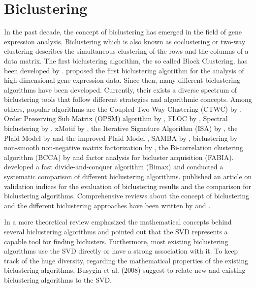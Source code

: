 \section{Biclustering} %
In the past decade, the concept of biclustering has emerged in the field of gene expression analysis. Biclustering which is also known as coclustering or two-way clustering describes the simultaneous clustering of the rows and the columns of a data matrix. 
The first biclustering algorithm, the so called Block Clustering, has been developed by \citet{Hartigan1972}. \citet{Cheng2000} proposed the first biclustering algorithm for the analysis of high dimensional gene expression data.
Since then, many different biclustering algorithms have been developed. 
Currently, their exists a diverse spectrum of biclustering tools that follow different strategies and algorithmic concepts.
Among others, popular algorithms are the Coupled Two-Way Clustering (CTWC) by \citet{Getz2000}, Order Preserving Sub Matrix (OPSM) algorithm by \citet{BenDor2003}, FLOC by \citet{Yang2003}, Spectral biclustering by \citet{Kluger2003}, xMotif by \citet{Kasif2003},
the Iterative Signature Algorithm (ISA) by \citet{Bergmann2003},
the Plaid Model by \citet{Lazzeroni2000} and the improved Plaid Model \cite{Turner2005}, SAMBA by \citet{Tanay2004}, biclustering by non-smooth non-negative matrix factorization by \citet{Carmona-Saez2006}, the Bi-correlation clustering algorithm (BCCA) by \citet{Bhattacharya2009} and factor analysis for bicluster acquisition (FABIA)\cite{Hochreiter2010}. \citet{Prelic2006} developed a fast divide-and-conquer algorithm (Bimax) and conducted a systematic comparison of different biclustering algorithms.
\citet{Santamaria2007} published an article on validation indices for the evaluation of biclustering results and the comparison for biclustering algorithms. Comprehensive reviews about the concept of biclustering and the different biclustering approaches have been written by \citet{Madeira2004} and \citet{Mechelen2004}.

In a more theoretical review \citet{Busygin2008} emphasized the mathematical concepts behind several biclustering algorithms and pointed out that the SVD represents a capable tool for finding biclusters. Furthermore, most existing biclustering algorithms use the SVD directly or have a strong association with it. To keep track of the huge diversity, regarding the mathematical properties of the existing biclustering algorithms, Busygin et al. (2008) suggest to relate new and existing biclustering algorithms to the SVD. 

